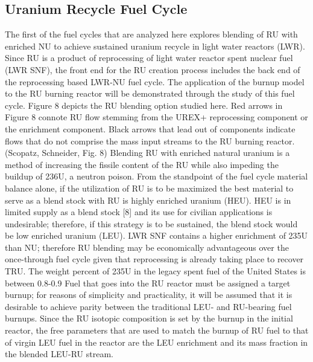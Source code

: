 \subsection{Uranium Recycle Fuel Cycle}
\label{1g_sec:UFC}
The first of the fuel cycles that are analyzed here explores blending of RU with enriched NU to achieve sustained uranium recycle in light water reactors (LWR).  Since RU is a product of reprocessing of light water reactor spent nuclear fuel (LWR SNF), the front end for the RU creation process includes the back end of the reprocessing based LWR-NU fuel cycle.  The application of the burnup model to the RU burning reactor will be demonstrated through the study of this fuel cycle.
Figure 8 depicts the RU blending option studied here.  Red arrows in Figure 8 connote RU flow stemming from the UREX+ reprocessing component or the enrichment component.  Black arrows that lead out of components indicate flows that do not comprise the mass input streams to the RU burning reactor.  
(Scopatz, Schneider, Fig. 8)
Blending RU with enriched natural uranium is a method of increasing the fissile content of the RU while also impeding the buildup of 236U, a neutron poison.  From the standpoint of the fuel cycle material balance alone, if the utilization of RU is to be maximized the best material to serve as a blend stock with RU is highly enriched uranium (HEU).  HEU is in limited supply as a blend stock [8] and its use for civilian applications is undesirable; therefore, if this strategy is to be sustained, the blend stock would be low enriched uranium (LEU).  
LWR SNF contains a higher enrichment of 235U than NU; therefore RU blending may be economically advantageous over the once-through fuel cycle given that reprocessing is already taking place to recover TRU. The weight percent of 235U in the legacy spent fuel of the United States is between 0.8-0.9%
Fuel that goes into the RU reactor must be assigned a target burnup; for reasons of simplicity and practicality, it will be assumed that it is desirable to achieve parity between the traditional LEU- and RU-bearing fuel burnups.  Since the RU isotopic composition is set by the burnup in the initial reactor, the free parameters that are used to match the burnup of RU fuel to that of virgin LEU fuel in the reactor are the LEU enrichment and its mass fraction in the blended LEU-RU stream.    
